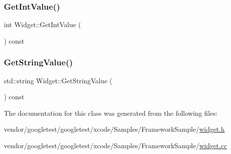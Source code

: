 \subsubsection{\texorpdfstring{Get\+Int\+Value()}{GetIntValue()}}
{\footnotesize\ttfamily int Widget\+::\+Get\+Int\+Value (\begin{DoxyParamCaption}{ }\end{DoxyParamCaption}) const}

\mbox{\label{class_widget_a7a6e3a7fca3a9373f631c94dc1494d22}} 
\subsubsection{\texorpdfstring{Get\+String\+Value()}{GetStringValue()}}
{\footnotesize\ttfamily std\+::string Widget\+::\+Get\+String\+Value (\begin{DoxyParamCaption}{ }\end{DoxyParamCaption}) const}



The documentation for this class was generated from the following files\+:\begin{DoxyCompactItemize}
\item 
vendor/googletest/googletest/xcode/\+Samples/\+Framework\+Sample/\hyperlink{widget_8h}{widget.\+h}\item 
vendor/googletest/googletest/xcode/\+Samples/\+Framework\+Sample/\hyperlink{widget_8cc}{widget.\+cc}\end{DoxyCompactItemize}
